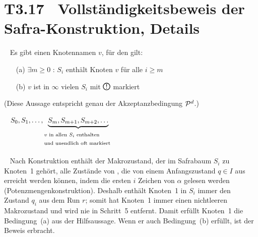 \documentclass[fontsize=11pt, twoside=false, numbers=autoenddot]{scrbook}
\begin{document}
%
\par\vspace*{-\baselineskip}
\qedhere

\section*{T3.17~ Vollständigkeitsbeweis der Safra-Konstruktion, Details}

~
Es gibt einen Knotennamen $v$, für den gilt:
\begin{itemize}
  \item[(a)]
    $\exists m \geqslant 0$ : 
    $S_i$ enthält Knoten $v$ für alle $i \geqslant m$
  \item[(b)]
    $v$ ist in $\infty$ vielen $S_i$ mit $\circled{!}$ markiert
\end{itemize}

\par\medskip\noindent
(Diese Aussage entspricht genau der Akzeptanzbedingung $\mathcal{P}^d$.)

\par\medskip\noindent
{}~
$S_0,S_1,\dots,\underbrace{S_m,S_{m+1},S_{m+2},\dots}_{%
  \text{%
    \begin{tabular}{@{}l@{}}
      $v$ in allen $S_i$ enthalten \\
      und unendlich oft markiert
    \end{tabular}
  }
}$

\par\medskip\noindent
{}~
Nach Konstruktion enthält der Makrozustand, der im Safrabaum $S_i$ zu Knoten~1 gehört,
alle Zustände von \Amc, die von einem Anfangszustand $q \in I$ aus erreicht werden können,
indem die ersten $i$ Zeichen von $\alpha$ gelesen werden (Potenzmengen\-konstruktion).
Deshalb enthält Knoten~1 in $S_i$ immer den Zustand $q_i$ aus dem Run $r$;
somit hat Knoten~1 immer einen nichtleeren Makrozustand
und wird nie in Schritt~5 entfernt.
Damit erfüllt Knoten~1 die Bedingung~(a) aus der Hilfsaussage.
Wenn er auch Bedingung~(b) erfüllt, ist der Beweis erbracht.
\end{document}
